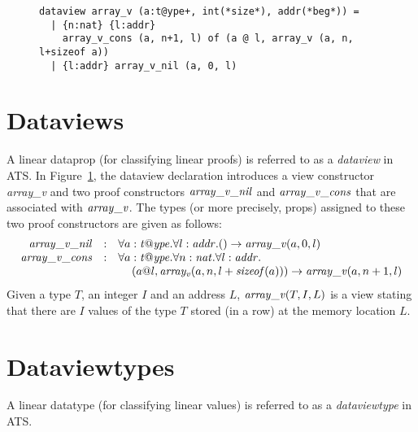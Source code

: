 \begin{figure}
\begin{verbatim}
dataview array_v (a:t@ype+, int(*size*), addr(*beg*)) =
  | {n:nat} {l:addr}
    array_v_cons (a, n+1, l) of (a @ l, array_v (a, n, l+sizeof a))
  | {l:addr} array_v_nil (a, 0, l)
\end{verbatim}
\caption{}
\label{figure:array_v}
\end{figure}
\section{Dataviews}
A linear dataprop (for classifying linear proofs) is referred to as a {\it
dataview} in ATS. In Figure~\ref{figure:array_v}, the dataview declaration
introduces a view constructor {\it array\_v} and two proof constructors
${\it array\_v\_nil}$ and ${\it array\_v\_cons}$ that are associated with
${\it array\_v}$. The types (or more precisely, props) assigned to these
two proof constructors are given as follows:
\[\begin{array}{rcl}
{\it array\_v\_nil} & : &
\forall a:{\it t@ype}.\forall l:{\it addr}. () \rightarrow {\it array\_v} (a, 0, l) \\
{\it array\_v\_cons} & : &
\forall a:{\it t@ype}.\forall n:{\it nat}.\forall l:{\it addr}. \\
&&\kern12pt
(a @ l, {\it array_v} (a, n, l+{\it sizeof}(a))) \rightarrow {\it array\_v} (a, n+1, l) \\
\end{array}\]
Given a type $T$, an integer $I$ and an address $L$, ${\it array\_v}(T, I,
L)$ is a view stating that there are $I$ values of the type $T$ stored (in
a row) at the memory location $L$.

\section{Dataviewtypes}
A linear datatype (for classifying linear values) is referred to as a {\it
dataviewtype} in ATS.

